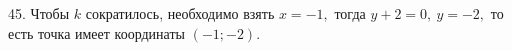 45. Чтобы $k$ сократилось, необходимо взять $x=-1,$ тогда $y+2=0,\ y=-2,$ то есть точка имеет координаты $(-1;-2).$\\

